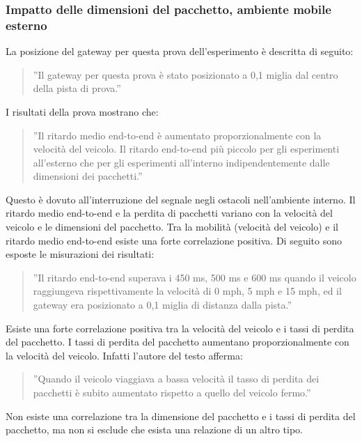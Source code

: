 \documentclass[a4paper]{report} %
\begin{document}
\subsubsection{Impatto delle dimensioni del pacchetto, ambiente mobile esterno}
La posizione del gateway per questa prova dell'esperimento \cite{art:rif.47} è descritta di seguito:
\begin{quote}
	''Il gateway per questa prova è stato posizionato a 0,1 miglia dal centro della pista di prova.''
\end{quote}
I risultati della prova mostrano che:
\begin{quote}
	''Il ritardo medio end-to-end è aumentato proporzionalmente con la velocità del veicolo. 
	Il ritardo end-to-end più piccolo per gli esperimenti all'esterno che per gli esperimenti all'interno indipendentemente dalle dimensioni dei pacchetti.'' 
\end{quote}
Questo è dovuto all'interruzione del segnale negli ostacoli nell'ambiente interno. Il ritardo medio end-to-end e la perdita di pacchetti variano con la velocità del veicolo e le dimensioni del pacchetto. Tra la mobilità (velocità del veicolo) e il ritardo medio end-to-end esiste una forte correlazione positiva. Di seguito sono esposte le misurazioni dei risultati:
\begin{quote}
	''Il ritardo end-to-end superava i 450 ms, 500 ms e 600 ms quando il veicolo raggiungeva rispettivamente la velocità di 0 mph, 5 mph e 15 mph, ed il gateway era posizionato a 0,1 miglia di distanza dalla pista.''
\end{quote}
Esiste una forte correlazione positiva tra la velocità del veicolo e i tassi di perdita del pacchetto. I tassi di perdita del pacchetto aumentano proporzionalmente con la velocità del veicolo. Infatti l'autore del testo \cite{art:rif.47} afferma:
\begin{quote}
	''Quando il veicolo viaggiava a bassa velocità il tasso di perdita dei pacchetti è subito aumentato rispetto a quello del veicolo fermo.''
\end{quote}
Non esiste una correlazione tra la dimensione del pacchetto e i tassi di perdita del pacchetto, ma non si esclude che esista una relazione di un altro tipo.
\end{document}
